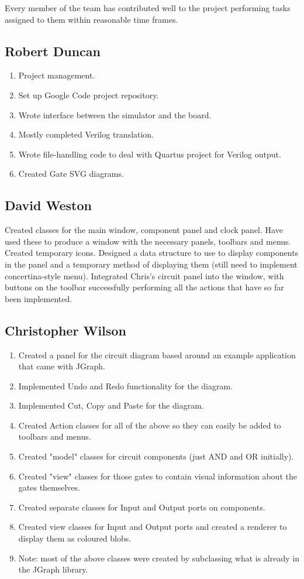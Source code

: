 \documentclass[12pt, a4paper, oneside,titlepage]{article}
\begin{document}
Every member of the team has contributed well to the project performing tasks assigned to them within reasonable time frames.
\subsection{Robert Duncan}
\begin{enumerate}
\item Project management.
\item Set up Google Code project repository.
\item Wrote interface between the simulator and the board.
\item Mostly completed Verilog translation. 
\item Wrote file-handling code to deal with Quartus project for Verilog output. 
\item Created Gate SVG diagrams.
\end{enumerate}
\subsection{David Weston}
\begin{enumerate}
\list Created classes for the main window, component panel and clock panel.
\list Have used these to produce a window with the necessary panels, toolbars and menus.
\list Created temporary icons.
\list Designed a data structure to use to display components in the panel and a temporary method of displaying them
(still need to implement concertina-style menu). 
\list Integrated Chris's circuit panel into the window, with buttons on the toolbar successfully performing all the actions that have so far been implemented.
\end{enumerate}
\subsection{Christopher Wilson}
\begin{enumerate}
    \item  Created a panel for the circuit diagram based around an example application that came with JGraph.
    \item Implemented Undo and Redo functionality for the diagram.
    \item Implemented Cut, Copy and Paste for the diagram.
    \item Created Action classes for all of the above so they can easily be added to toolbars and menus.
    \item Created "model" classes for circuit components (just AND and OR initially).
    \item Created "view" classes for those gates to contain visual information about the gates themselves.
    \item Created separate classes for Input and Output ports on components.
    \item Created view classes for Input and Output ports and created a renderer to display them as coloured blobs.
    \item Note: most of the above classes were created by subclassing what is already in the JGraph library.
\end{enumerate}
\end{document}

